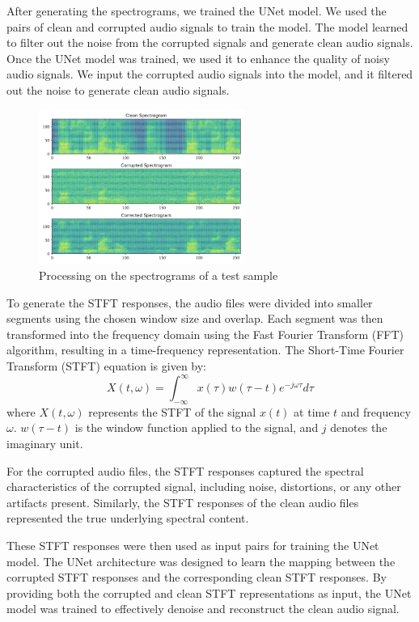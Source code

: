 \documentclass[conference]{IEEEtran}
\begin{document}
After generating the spectrograms, we trained the UNet model. We used the pairs of clean and corrupted audio signals to train the model. The model learned to filter out the noise from the corrupted signals and generate clean audio signals. Once the UNet model was trained, we used it to enhance the quality of noisy audio signals. We input the corrupted audio signals into the model, and it filtered out the noise to generate clean audio signals.


\begin{figure}[t!]
    \centering
    \includegraphics[width=0.6\textwidth]{figures/spectrograms.png}
    \caption{Processing on the spectrograms of a test sample}
    \label{fig:fig1}
\end{figure}

To generate the STFT responses, the audio files were divided into smaller segments using the chosen window size and overlap. Each segment was then transformed into the frequency domain using the Fast Fourier Transform (FFT) algorithm, resulting in a time-frequency representation.
The Short-Time Fourier Transform (STFT) equation is given by:
\begin{equation*}
    X(t, \omega) = \int_{-\infty}^{\infty} x(\tau) w(\tau - t) e^{-j\omega\tau} d\tau
\end{equation*}
where $X(t, \omega)$ represents the STFT of the signal $x(t)$ at time $t$ and frequency $\omega$. $w(\tau - t)$ is the window function applied to the signal, and $j$ denotes the imaginary unit.

For the corrupted audio files, the STFT responses captured the spectral characteristics of the corrupted signal, including noise, distortions, or any other artifacts present. Similarly, the STFT responses of the clean audio files represented the true underlying spectral content.

These STFT responses were then used as input pairs for training the UNet model. The UNet architecture was designed to learn the mapping between the corrupted STFT responses and the corresponding clean STFT responses. By providing both the corrupted and clean STFT representations as input, the UNet model was trained to effectively denoise and reconstruct the clean audio signal.
\end{document}
